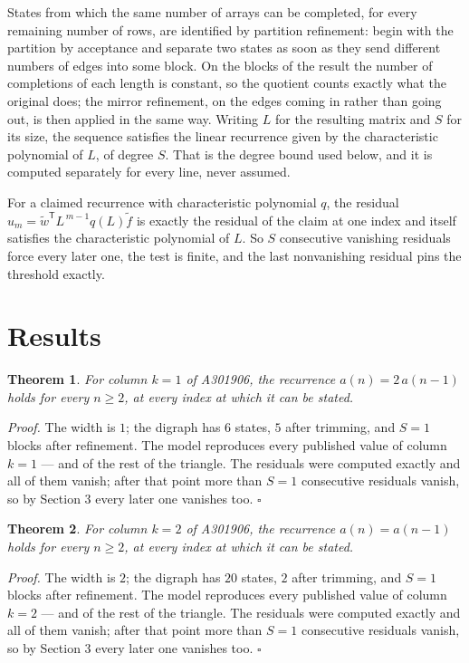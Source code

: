 \documentclass[11pt]{article}
\newtheorem{theorem}{Theorem}
\theoremstyle{definition}
\begin{document}
States from which the same number of arrays can be completed, for every remaining number of rows, are identified by partition refinement: begin with the partition by acceptance and separate two states as soon as they send different numbers of edges into some block. On the blocks of the result the number of completions of each length is constant, so the quotient counts exactly what the original does; the mirror refinement, on the edges coming in rather than going out, is then applied in the same way. Writing $L$ for the resulting matrix and $S$ for its size, the sequence satisfies the linear recurrence given by the characteristic polynomial of $L$, of degree $S$. That is the degree bound used below, and it is computed separately for every line, never assumed.

For a claimed recurrence with characteristic polynomial $q$, the residual $u_m = \tilde w^{\mathsf T}L^{\,m-1}q(L)\tilde f$ is exactly the residual of the claim at one index and itself satisfies the characteristic polynomial of $L$. So $S$ consecutive vanishing residuals force every later one, the test is finite, and the last nonvanishing residual pins the threshold exactly.

\section{Results}

\begin{theorem} For column $k = 1$ of A301906, the recurrence $a(n) = 2\,a(n-1)$ holds for every $n \ge 2$, at every index at which it can be stated.\end{theorem}

{\itshape Proof.} The width is $1$; the digraph has $6$ states, $5$ after trimming, and $S = 1$ blocks after refinement. The model reproduces every published value of column $k = 1$ --- and of the rest of the triangle. The residuals were computed exactly and all of them vanish; after that point more than $S = 1$ consecutive residuals vanish, so by Section 3 every later one vanishes too. $\square$

\begin{theorem} For column $k = 2$ of A301906, the recurrence $a(n) = a(n-1)$ holds for every $n \ge 2$, at every index at which it can be stated.\end{theorem}

{\itshape Proof.} The width is $2$; the digraph has $20$ states, $2$ after trimming, and $S = 1$ blocks after refinement. The model reproduces every published value of column $k = 2$ --- and of the rest of the triangle. The residuals were computed exactly and all of them vanish; after that point more than $S = 1$ consecutive residuals vanish, so by Section 3 every later one vanishes too. $\square$
\end{document}
